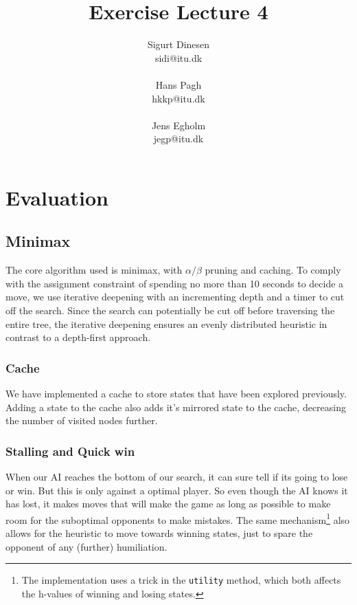 \documentclass[a4paper, titlepage]{article}
\begin{document}
\title{Exercise Lecture 4}
\author{Sigurt Dinesen \\sidi@itu.dk \\\\ Hans Pagh \\hkkp@itu.dk 
\\\\Jens Egholm \\jegp@itu.dk}
\maketitle
\pagebreak

\section*{Evaluation}
\subsection*{Minimax}
The core algorithm used is minimax, with $\alpha/\beta$ pruning and caching. To
comply with the assignment constraint of spending no more than 10 seconds to
decide a move, we use iterative deepening with an incrementing depth and a timer
to cut off the search. Since the search can potentially be cut off before
traversing the entire tree, the iterative deepening ensures an evenly
distributed heuristic in contrast to a depth-first approach.

\subsubsection*{Cache}
We have implemented a cache to store states that have been explored previously.
Adding a state to the cache also adds it's mirrored state to the cache,
decreasing the number of visited nodes further.

\subsubsection*{Stalling and Quick win}
When our AI reaches the bottom of our search, it can sure tell if its going to
lose or win. But this is only against a optimal player. So even though the AI
knows it has lost, it makes moves that will make the game as long as possible to
make room for the suboptimal opponents to make mistakes. The same
mechanism\footnote{The implementation uses a trick in the \texttt{utility}
method, which both affects the h-values of winning and losing states.} also
allows for the heuristic to move towards winning states, just to spare the
opponent of any (further) humiliation.
\end{document}
